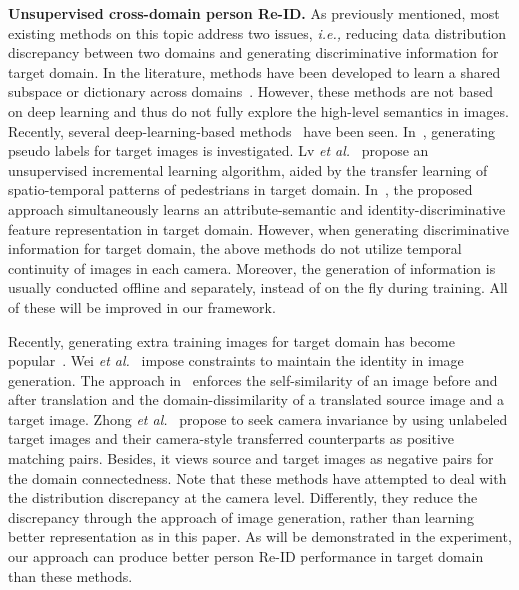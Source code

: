 \documentclass[10pt,twocolumn,letterpaper]{article}
\begin{document}
\textbf{Unsupervised cross-domain person Re-ID.} As previously mentioned, most existing methods on this topic address two issues, \textit{i.e.,} reducing data distribution discrepancy between two domains and generating discriminative information for target domain. In the literature, methods have been developed to learn a shared subspace or dictionary across domains~\cite{DBLP:conf/cvpr/PengXWPGHT16, DBLP:journals/tcsv/WangZLZ16, DBLP:journals/tip/MaLYL15,qi2018unsupervised}. However, these methods are not based on deep learning and thus do not fully explore the high-level semantics in images. Recently, several deep-learning-based methods~\cite{zhong2018generalizing,Bak_2018_ECCV,wang2018transferable,lv2018unsupervised} have been seen. In~\cite{lv2018unsupervised,wang2018transferable}, generating pseudo labels for target images is investigated. Lv \textit{et al.}~\cite{lv2018unsupervised} propose an unsupervised incremental learning algorithm, aided by the transfer learning of spatio-temporal patterns of pedestrians in target domain. In~\cite{wang2018transferable}, the proposed approach simultaneously learns an attribute-semantic and identity-discriminative feature representation in target domain. However, when generating discriminative information for target domain, the above methods do not utilize temporal continuity of images in each camera. Moreover, the generation of information is usually conducted offline and separately, instead of on the fly during training. All of these will be improved in our framework. 
 


Recently, generating extra training images for target domain has become popular~\cite{wei2018person,deng2018image,zhong2018generalizing,Bak_2018_ECCV}. 
Wei \textit{et al.}~\cite{wei2018person} impose constraints to maintain the identity in image generation. The approach in~\cite{deng2018image} enforces the self-similarity of an image before and after translation and the domain-dissimilarity of a translated source image and a target image. Zhong \textit{et al.}~\cite{zhong2018generalizing} propose to seek camera invariance by using unlabeled target images and their camera-style transferred counterparts as positive matching pairs. Besides, it views source and target images as negative pairs for the domain connectedness. Note that these methods have attempted to deal with the distribution discrepancy at the camera level. Differently, they reduce the discrepancy through the approach of image generation, rather than learning better representation as in this paper. As will be demonstrated in the experiment, our approach can produce better person Re-ID performance in target domain than these methods.
 
\end{document}
